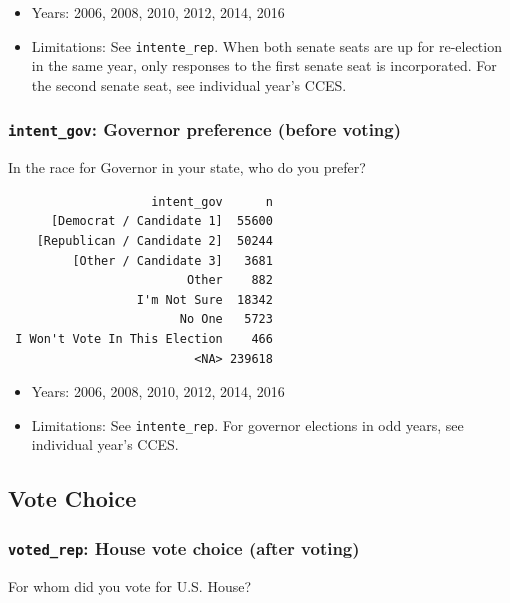 \documentclass[10pt,article,oneside]{memoir}
\theoremstyle{definition}
\begin{document}
\begin{itemize}
\tightlist
\item
  Years: 2006, 2008, 2010, 2012, 2014, 2016
\item
  Limitations: See \texttt{intente\_rep}. When both senate seats are up
  for re-election in the same year, only responses to the first senate
  seat is incorporated. For the second senate seat, see individual
  year's CCES.
\end{itemize}

\subsubsection{\texorpdfstring{\texttt{intent\_gov}: Governor preference
(before
voting)}{intent\_gov: Governor preference (before voting)}}\label{intent_gov-governor-preference-before-voting}

In the race for Governor in your state, who do you prefer?

\begin{verbatim}
                    intent_gov      n
      [Democrat / Candidate 1]  55600
    [Republican / Candidate 2]  50244
         [Other / Candidate 3]   3681
                         Other    882
                  I'm Not Sure  18342
                        No One   5723
 I Won't Vote In This Election    466
                          <NA> 239618
\end{verbatim}

\begin{itemize}
\tightlist
\item
  Years: 2006, 2008, 2010, 2012, 2014, 2016
\item
  Limitations: See \texttt{intente\_rep}. For governor elections in odd
  years, see individual year's CCES.
\end{itemize}

\subsection{Vote Choice}\label{vote-choice}

\subsubsection{\texorpdfstring{\texttt{voted\_rep}: House vote choice
(after
voting)}{voted\_rep: House vote choice (after voting)}}\label{voted_rep-house-vote-choice-after-voting}

For whom did you vote for U.S. House?
\end{document}
